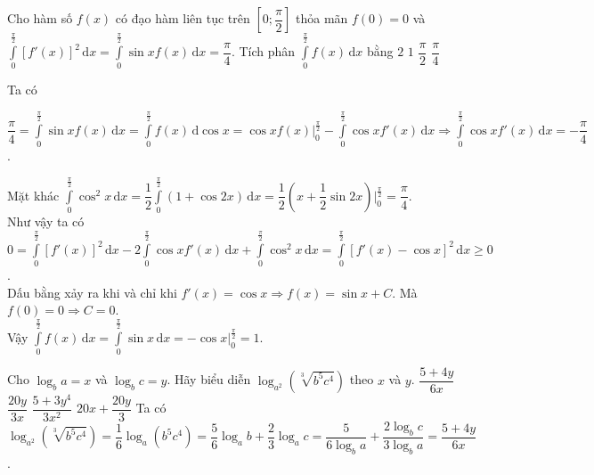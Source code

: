 \begin{ex}%
	Cho hàm số $f(x)$ có đạo hàm liên tục trên $\left[0;\dfrac{\pi}{2}\right]$ thỏa mãn $f(0)=0$ và $\displaystyle\int\limits_0^{\frac{\pi}{2}} \left[f'(x)\right]^2 \mathrm{\,d}x=\displaystyle\int\limits_0^{\frac{\pi}{2}} \sin x f(x)\mathrm{\,d}x=\dfrac{\pi}{4}$. Tích phân $\displaystyle\int\limits_0^{\frac{\pi}{2}} f(x)\mathrm{\,d}x$ bằng
	\choice
	{$2$}
	{\True $1$}
	{$\dfrac{\pi}{2}$}
	{$\dfrac{\pi}{4}$}
	\loigiai
	{
		Ta có 
		\begin{center}
			$\dfrac{\pi}{4}=\displaystyle\int\limits_0^{\frac{\pi}{2}} \sin x f(x)\mathrm{\,d}x=\displaystyle\int\limits_0^{\frac{\pi}{2}} f(x)\mathrm{\,d}\cos x=\cos xf(x)\bigg|_0^{\frac{\pi}{2}}-\displaystyle\int\limits_0^{\frac{\pi}{2}} \cos x f'(x)\mathrm{\,d}x\Rightarrow \displaystyle\int\limits_0^{\frac{\pi}{2}} \cos x f'(x)\mathrm{\,d}x=-\dfrac{\pi}{4}$.
		\end{center}
	Mặt khác $\displaystyle\int\limits_0^{\frac{\pi}{2}} \cos^2 x \mathrm{\,d}x=\dfrac{1}{2}\displaystyle\int\limits_0^{\frac{\pi}{2}} (1+\cos 2x)\mathrm{\,d}x=\dfrac{1}{2}\left(x+\dfrac{1}{2}\sin 2x\right)\bigg|_0^{\frac{\pi}{2}}=\dfrac{\pi}{4}$.\\
	Như vậy ta có $0=\displaystyle\int\limits_0^{\frac{\pi}{2}} \left[f'(x)\right]^2 \mathrm{\,d}x-2\displaystyle\int\limits_0^{\frac{\pi}{2}} \cos x f'(x)\mathrm{\,d}x+\displaystyle\int\limits_0^{\frac{\pi}{2}} \cos^2 x \mathrm{\,d}x=\displaystyle\int\limits_0^{\frac{\pi}{2}} \left[f'(x)-\cos x\right]^2\mathrm{\,d}x\ge 0$.\\
	Dấu bằng xảy ra khi và chỉ khi $f'(x)=\cos x\Rightarrow f(x)=\sin x +C$. Mà $f(0)=0\Rightarrow C=0$.\\
	Vậy $\displaystyle\int\limits_0^{\frac{\pi}{2}} f(x)\mathrm{\,d}x=\displaystyle\int\limits_0^{\frac{\pi}{2}} \sin x\mathrm{\,d}x=-\cos x\bigg|_0^{\frac{\pi}{2}}=1$.
	}
\end{ex} 

\begin{ex}%
	Cho $\log_b a=x$ và $\log_b c=y$. Hãy biểu diễn $\log_{a^2}\left(\sqrt[3]{b^5c^4}\right)$ theo $x$ và $y$.
	\choice
	{\True $\dfrac{5+4y}{6x}$}
	{$\dfrac{20y}{3x}$}
	{$\dfrac{5+3y^4}{3x^2}$}
	{$20x+\dfrac{20y}{3}$}
	\loigiai
	{
		Ta có $\log_{a^2}\left(\sqrt[3]{b^5c^4}\right)=\dfrac{1}{6}\log_a(b^5c^4)=\dfrac{5}{6}\log_ab+\dfrac{2}{3}\log_ac=\dfrac{5}{6\log_ba}+\dfrac{2\log_bc}{3\log_ba}=\dfrac{5+4y}{6x}$.
	}
\end{ex} 

